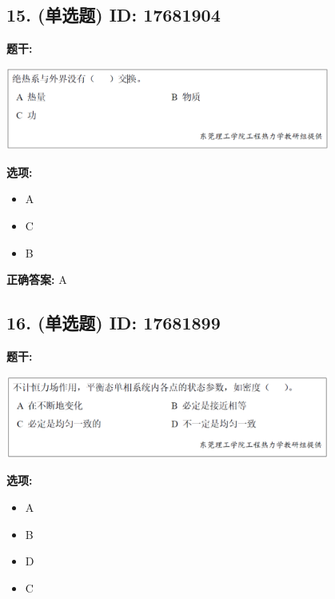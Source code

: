 \documentclass[12pt]{article}
\begin{document}
\subsection*{15. (单选题) \small ID: 17681904}

\textbf{题干:}


\begin{center}\includegraphics[width=0.8\textwidth, height=0.25\textheight, keepaspectratio]{question_15_17681904/title_img_1.png}\end{center}

\textbf{选项:}
\begin{itemize}[leftmargin=*]
  \item A

  \item C

  \item B

\end{itemize}

\textbf{正确答案:}
A

\vspace{0.5em}\hrulefill\vspace{1em}

\subsection*{16. (单选题) \small ID: 17681899}

\textbf{题干:}


\begin{center}\includegraphics[width=0.8\textwidth, height=0.25\textheight, keepaspectratio]{question_16_17681899/title_img_1.png}\end{center}

\textbf{选项:}
\begin{itemize}[leftmargin=*]
  \item A

  \item B

  \item D

  \item C

\end{itemize}
\end{document}
